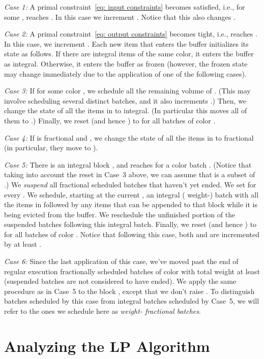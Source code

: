 \documentclass[12pt]{article}
\begin{document}
{\em Case 1:}\/ A primal constraint~\eqref{eq: input constraints}
becomes satisfied, i.e., for some , 
reaches . In this case we increment . Notice that this also
changes .

{\em Case 2:}\/ A primal constraint~\eqref{eq: output constraints}
becomes tight, i.e.,  reaches .
In this case, we increment . Each new item that enters the
buffer initializes its state as follows. If there are integral
items of the same color, it enters the buffer as integral.
Otherwise, it enters the buffer as frozen (however, the
frozen state may change immediately due to the application
of one of the following cases).

{\em Case 3:}\/ If  for
some color , we schedule all the remaining
volume of . (This may involve scheduling
several distinct batches, and it also increments .) Then,
we change the state of all the items in  to integral.
(In particular this moves all of them to .)
Finally, we reset  (and hence ) 
to  for all batches  of color .

{\em Case 4:}\/ If  is fractional and
, we change the
state of all the items in  to fractional
(in particular, they move to ).

{\em Case 5:}\/ There is an integral block ,
and  reaches  for a color 
batch . (Notice that taking into account the reset
in Case~3 above, we can assume that  is a subset of 
.)
We {\em suspend} all fractional scheduled batches
that haven't yet ended. We set
 for every .
We schedule, starting at the current , an integral
( weight-) batch with all the items in  followed
by any items that can be appended to that block while it
is being evicted from the buffer. We reschedule
the unfinished portion of the suspended batches following
this integral batch. Finally, we reset  
(and hence ) to  for all batches  of 
color . Notice that following this case, both
 and  are incremented by at least .

{\em Case 6:}\/ Since the last application of this case, we've
moved past the end of regular execution fractionally scheduled 
batches of color  with total weight at least 
(suspended batches are not considered to have ended).
We apply the same procedure as in Case~5 to the block
, except that we don't raise . To
distinguish batches scheduled by this case from integral
batches scheduled by Case~5, we will refer to the ones
we schedule here as {\em weight- fractional batches}.



\section{Analyzing the LP Algorithm}\label{sec: frac analysis}
\end{document}

